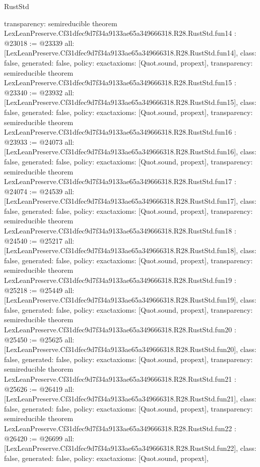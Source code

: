 \begin{lexlean}{RustStd}
\begin{coremodule}
{  transparency: semireducible
}
theorem LexLeanPreserve.Cf31dfec9d7f34a9133ae65a349666318.R28.RustStd.fun14 : @23018 := @23339 {
  all: [LexLeanPreserve.Cf31dfec9d7f34a9133ae65a349666318.R28.RustStd.fun14],
  class: false,
  generated: false,
  policy: exact{axioms: [Quot.sound, propext]},
  transparency: semireducible
}
theorem LexLeanPreserve.Cf31dfec9d7f34a9133ae65a349666318.R28.RustStd.fun15 : @23340 := @23932 {
  all: [LexLeanPreserve.Cf31dfec9d7f34a9133ae65a349666318.R28.RustStd.fun15],
  class: false,
  generated: false,
  policy: exact{axioms: [Quot.sound, propext]},
  transparency: semireducible
}
theorem LexLeanPreserve.Cf31dfec9d7f34a9133ae65a349666318.R28.RustStd.fun16 : @23933 := @24073 {
  all: [LexLeanPreserve.Cf31dfec9d7f34a9133ae65a349666318.R28.RustStd.fun16],
  class: false,
  generated: false,
  policy: exact{axioms: [Quot.sound, propext]},
  transparency: semireducible
}
theorem LexLeanPreserve.Cf31dfec9d7f34a9133ae65a349666318.R28.RustStd.fun17 : @24074 := @24539 {
  all: [LexLeanPreserve.Cf31dfec9d7f34a9133ae65a349666318.R28.RustStd.fun17],
  class: false,
  generated: false,
  policy: exact{axioms: [Quot.sound, propext]},
  transparency: semireducible
}
theorem LexLeanPreserve.Cf31dfec9d7f34a9133ae65a349666318.R28.RustStd.fun18 : @24540 := @25217 {
  all: [LexLeanPreserve.Cf31dfec9d7f34a9133ae65a349666318.R28.RustStd.fun18],
  class: false,
  generated: false,
  policy: exact{axioms: [Quot.sound, propext]},
  transparency: semireducible
}
theorem LexLeanPreserve.Cf31dfec9d7f34a9133ae65a349666318.R28.RustStd.fun19 : @25218 := @25449 {
  all: [LexLeanPreserve.Cf31dfec9d7f34a9133ae65a349666318.R28.RustStd.fun19],
  class: false,
  generated: false,
  policy: exact{axioms: [Quot.sound, propext]},
  transparency: semireducible
}
theorem LexLeanPreserve.Cf31dfec9d7f34a9133ae65a349666318.R28.RustStd.fun20 : @25450 := @25625 {
  all: [LexLeanPreserve.Cf31dfec9d7f34a9133ae65a349666318.R28.RustStd.fun20],
  class: false,
  generated: false,
  policy: exact{axioms: [Quot.sound, propext]},
  transparency: semireducible
}
theorem LexLeanPreserve.Cf31dfec9d7f34a9133ae65a349666318.R28.RustStd.fun21 : @25626 := @26419 {
  all: [LexLeanPreserve.Cf31dfec9d7f34a9133ae65a349666318.R28.RustStd.fun21],
  class: false,
  generated: false,
  policy: exact{axioms: [Quot.sound, propext]},
  transparency: semireducible
}
theorem LexLeanPreserve.Cf31dfec9d7f34a9133ae65a349666318.R28.RustStd.fun22 : @26420 := @26699 {
  all: [LexLeanPreserve.Cf31dfec9d7f34a9133ae65a349666318.R28.RustStd.fun22],
  class: false,
  generated: false,
  policy: exact{axioms: [Quot.sound, propext]},
}
\end{coremodule}
\end{lexlean}

